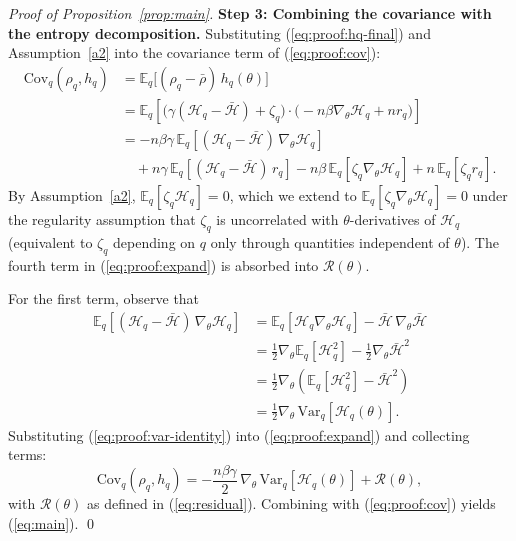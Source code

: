 \documentclass[10pt]{article}
\begin{document}
\begin{proof}[Proof of Proposition~\ref{prop:main}]
\medskip
\noindent\textbf{Step 3: Combining the covariance with the entropy decomposition.}
Substituting (\ref{eq:proof:hq-final}) and Assumption~\ref{a2} into the
covariance term of (\ref{eq:proof:cov}):
\begin{align}
\mathrm{Cov}_q(\rho_q, h_q)
&= \mathbb{E}_q\big[(\rho_q - \bar\rho)\, h_q(\theta)\big] \nonumber\\
&= \mathbb{E}_q\!\left[\big(\gamma(\mathcal{H}_q - \bar{\mathcal{H}}) + \zeta_q\big)
   \cdot \big(-n\beta \nabla_\theta \mathcal{H}_q + n r_q\big)\right] \nonumber\\
&= -n\beta\gamma\, \mathbb{E}_q[(\mathcal{H}_q - \bar{\mathcal{H}})\, \nabla_\theta \mathcal{H}_q] \nonumber\\
&\quad + n\gamma\, \mathbb{E}_q[(\mathcal{H}_q - \bar{\mathcal{H}})\, r_q]
   - n\beta\, \mathbb{E}_q[\zeta_q \nabla_\theta \mathcal{H}_q]
   + n\, \mathbb{E}_q[\zeta_q r_q].
\label{eq:proof:expand}
\end{align}
By Assumption~\ref{a2}, $\mathbb{E}_q[\zeta_q \mathcal{H}_q] = 0$, which we extend
to $\mathbb{E}_q[\zeta_q \nabla_\theta \mathcal{H}_q] = 0$ under the regularity
assumption that $\zeta_q$ is uncorrelated with $\theta$-derivatives of
$\mathcal{H}_q$ (equivalent to $\zeta_q$ depending on $q$ only through quantities
independent of $\theta$). The fourth term in (\ref{eq:proof:expand}) is
absorbed into $\mathcal{R}(\theta)$.

For the first term, observe that
\begin{align}
\mathbb{E}_q[(\mathcal{H}_q - \bar{\mathcal{H}})\, \nabla_\theta \mathcal{H}_q]
&= \mathbb{E}_q[\mathcal{H}_q \nabla_\theta \mathcal{H}_q] - \bar{\mathcal{H}}\, \nabla_\theta \bar{\mathcal{H}} \nonumber\\
&= \tfrac{1}{2}\nabla_\theta \mathbb{E}_q[\mathcal{H}_q^2] - \tfrac{1}{2}\nabla_\theta \bar{\mathcal{H}}^2 \nonumber\\
&= \tfrac{1}{2} \nabla_\theta\!\left(\mathbb{E}_q[\mathcal{H}_q^2] - \bar{\mathcal{H}}^2\right) \nonumber\\
&= \tfrac{1}{2} \nabla_\theta\, \mathrm{Var}_q[\mathcal{H}_q(\theta)].
\label{eq:proof:var-identity}
\end{align}
Substituting (\ref{eq:proof:var-identity}) into (\ref{eq:proof:expand}) and
collecting terms:
\begin{equation}
\mathrm{Cov}_q(\rho_q, h_q) = -\frac{n\beta\gamma}{2}\, \nabla_\theta\, \mathrm{Var}_q[\mathcal{H}_q(\theta)]
+ \mathcal{R}(\theta),
\end{equation}
with $\mathcal{R}(\theta)$ as defined in (\ref{eq:residual}). Combining with
(\ref{eq:proof:cov}) yields (\ref{eq:main}). \qed
\end{proof}
\end{document}
